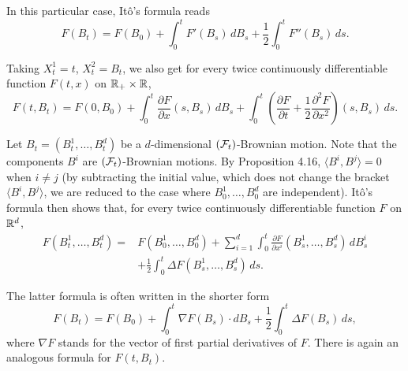 \documentclass[../Main.tex]{subfiles}
\begin{document}
In this particular case, Itô's formula reads
\[ F(B_t) = F(B_0)+\int_0^t F'(B_s)\,dB_s+\frac{1}{2}\int_0^t F''(B_s)\,ds. \]

Taking \(X_t^1=t\), \(X_t^2=B_t\), we also get for every twice continuously
differentiable function \(F(t,x)\) on \(\mathbb{R}_+\times\mathbb{R}\),
\[ F(t,B_t) = F(0,B_0) +\int_0^t\frac{\partial F}{\partial x}(s,B_s)\,dB_s +\int_0^t \left( \frac{\partial F}{\partial t} +\frac{1}{2}\frac{\partial^2F}{\partial x^2} \right)(s,B_s)\,ds. \]

Let \(B_t=(B_t^1,\ldots,B_t^d)\) be a \(d\)-dimensional \((\mathcal{F}_t)\)-Brownian motion. Note that the components \(B^i\) are \((\mathcal{F}_t)\)-Brownian motions. By Proposition {\color{red}4.16}, \(\langle B^i,B^j\rangle=0\) when \(i\neq j\) (by subtracting the initial value, which does not change the bracket \(\langle B^i,B^j\rangle\), we are reduced to the case where \(B_0^1,\ldots,B_0^d\) are independent). Itô's formula then shows that, for every twice continuously differentiable function \(F\) on \(\mathbb{R}^d\),
\[
\begin{aligned}
F(B_t^1,\ldots,B_t^d)
={}&F(B_0^1,\ldots,B_0^d)
+\sum_{i=1}^d\int_0^t
\frac{\partial F}{\partial x^i}(B_s^1,\ldots,B_s^d)\,dB_s^i \\
&+\frac{1}{2}\int_0^t\Delta F(B_s^1,\ldots,B_s^d)\,ds.
\end{aligned}
\]

The latter formula is often written in the shorter form
\[ F(B_t) = F(B_0)+\int_0^t\nabla F(B_s)\cdot dB_s +\frac{1}{2}\int_0^t\Delta F(B_s)\,ds, \]
where \(\nabla F\) stands for the vector of first partial derivatives of \(F\). There is again an analogous formula for \(F(t,B_t)\).
\end{document}

